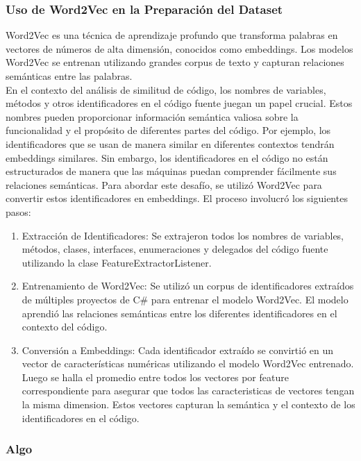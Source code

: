 \subsubsection{Uso de Word2Vec en la Preparación del Dataset}
Word2Vec es una técnica de aprendizaje profundo que transforma palabras en vectores de números de alta dimensión, conocidos como embeddings. Los modelos Word2Vec se entrenan utilizando grandes corpus de texto y capturan relaciones semánticas entre las palabras.  \\

En el contexto del análisis de similitud de código, los nombres de variables, métodos y otros identificadores en el código fuente juegan un papel crucial. Estos nombres pueden proporcionar información semántica valiosa sobre la funcionalidad y el propósito de diferentes partes del código. Por ejemplo, los identificadores que se usan de manera similar en diferentes contextos tendrán embeddings similares. Sin embargo, los identificadores en el código no están estructurados de manera que las máquinas puedan comprender fácilmente sus relaciones semánticas. Para abordar este desafío, se utilizó Word2Vec para convertir estos identificadores en embeddings. El proceso involucró los siguientes pasos:

\begin{enumerate}
	\item Extracción de Identificadores: Se extrajeron todos los nombres de variables, métodos, clases, interfaces, enumeraciones y delegados del código fuente utilizando la clase FeatureExtractorListener.
	
	\item Entrenamiento de Word2Vec: Se utilizó un corpus de identificadores extraídos de múltiples proyectos de C\# para entrenar el modelo Word2Vec. El modelo aprendió las relaciones semánticas entre los diferentes identificadores en el contexto del código.
	
	\item Conversión a Embeddings: Cada identificador extraído se convirtió en un vector de características numéricas utilizando el modelo Word2Vec entrenado. Luego se halla el promedio entre todos los vectores por feature correspondiente para asegurar que todos las caracteristicas de vectores tengan la misma dimension. Estos vectores capturan la semántica y el contexto de los identificadores en el código.
	 
\end{enumerate}

\subsubsection{Algo}

